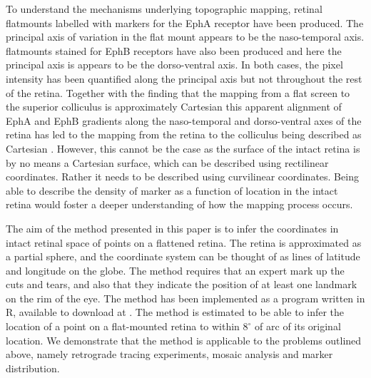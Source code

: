 \documentclass[10pt]{article}
\begin{document}
To understand the mechanisms underlying topographic mapping, retinal
flatmounts labelled with markers for the EphA receptor
\cite{ChenEtal95comp} have been produced. The principal axis of
variation in the flat mount appears to be the naso-temporal axis.
flatmounts stained for EphB receptors have also been produced
\cite{BirgEtal00kina} and here the principal axis is appears to be the
dorso-ventral axis. In both cases, the pixel intensity has been
quantified along the principal axis but not throughout the rest of the
retina.  Together with the finding that the mapping from a flat screen
to the superior colliculus is approximately Cartesian
\cite{DragHube76topo} this apparent alignment of EphA and EphB
gradients along the naso-temporal and dorso-ventral axes of the retina
has led to the mapping from the retina to the colliculus being
described as Cartesian \cite{BeviEtal11gene}. However, this cannot be
the case as the surface of the intact retina is by no means a
Cartesian surface, which can be described using rectilinear
coordinates.  Rather it needs to be described using curvilinear
coordinates. Being able to describe the density of marker as a
function of location in the intact retina would foster a deeper
understanding of how the mapping process occurs.


The aim of the method presented in this paper is to infer the
coordinates in intact retinal space of points on a flattened
retina. The retina is approximated as a partial sphere, and the
coordinate system can be thought of as lines of latitude and longitude
on the globe.  The method requires that an expert mark up the cuts and
tears, and also that they indicate the position of at least one
landmark on the rim of the eye. The method has been implemented as a
program written in R, available to download at
. The method is estimated to be
able to infer the location of a point on a flat-mounted retina to
within $8^\circ$ of arc of its original location. We demonstrate that
the method is applicable to the problems outlined above, namely
retrograde tracing experiments, mosaic analysis and marker
distribution.
\end{document}
